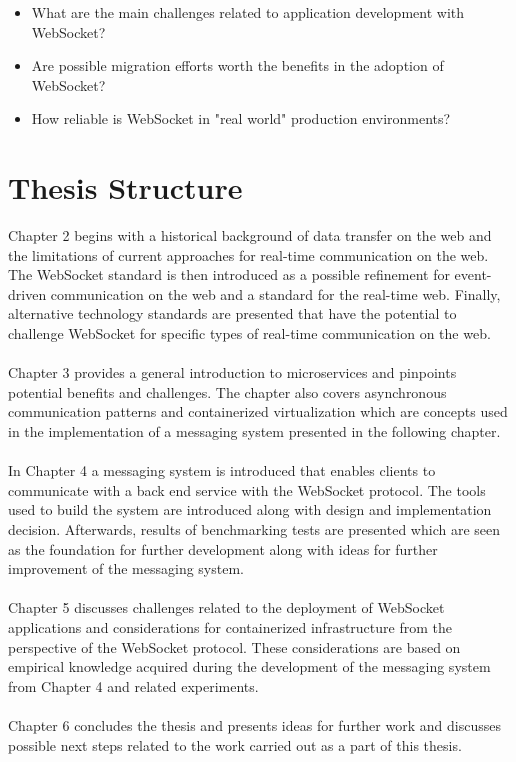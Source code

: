 \begin{itemize}
\item What are the main challenges related to application development with WebSocket?
\item Are possible migration efforts worth the benefits in the adoption of WebSocket?
\item How reliable is WebSocket in "real world" production environments?
\end{itemize}

\section{Thesis Structure}

Chapter 2 begins with a historical background of data transfer on the web and the limitations of current approaches for real-time communication on the web. The WebSocket standard is then introduced as a possible refinement for event-driven communication on the web and a standard for the real-time web. Finally, alternative technology standards are presented that have the potential to challenge WebSocket for specific types of real-time communication on the web.
\\ \\
Chapter 3 provides a general introduction to microservices and pinpoints potential benefits and challenges. The chapter also covers asynchronous communication patterns and containerized virtualization which are concepts used in the implementation of a messaging system presented in the following chapter.
\\ \\
In Chapter 4 a messaging system is introduced that enables clients to communicate with a back end service with the WebSocket protocol. The tools used to build the system are introduced along with design and implementation decision. Afterwards, results of benchmarking tests are presented which are seen as the foundation for further development along with ideas for further improvement of the messaging system.
\\ \\
Chapter 5 discusses challenges related to the deployment of WebSocket applications and considerations for containerized infrastructure from the perspective of the WebSocket protocol. These considerations are based on empirical knowledge acquired during the development of the messaging system from Chapter 4 and related experiments.
\\ \\
Chapter 6 concludes the thesis and presents ideas for further work and discusses possible next steps related to the work carried out as a part of this thesis.